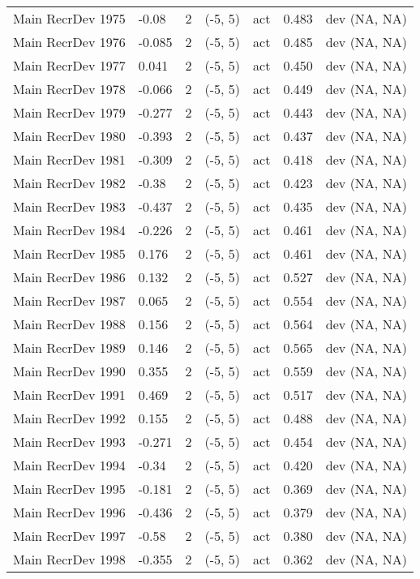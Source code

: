 \documentclass[11pt,
  english,
  letterpaper,
]{article}
\begin{document}
\begin{landscape}
\begin{longtable}[t]{>{\raggedright\arraybackslash}p{7.5cm}lllll>{\raggedright\arraybackslash}p{3.5cm}}
Main RecrDev 1975 & -0.08 & 2 & (-5, 5) & act & 0.483 & dev (NA, NA)\\
Main RecrDev 1976 & -0.085 & 2 & (-5, 5) & act & 0.485 & dev (NA, NA)\\
Main RecrDev 1977 & 0.041 & 2 & (-5, 5) & act & 0.450 & dev (NA, NA)\\
Main RecrDev 1978 & -0.066 & 2 & (-5, 5) & act & 0.449 & dev (NA, NA)\\
Main RecrDev 1979 & -0.277 & 2 & (-5, 5) & act & 0.443 & dev (NA, NA)\\
Main RecrDev 1980 & -0.393 & 2 & (-5, 5) & act & 0.437 & dev (NA, NA)\\
Main RecrDev 1981 & -0.309 & 2 & (-5, 5) & act & 0.418 & dev (NA, NA)\\
Main RecrDev 1982 & -0.38 & 2 & (-5, 5) & act & 0.423 & dev (NA, NA)\\
Main RecrDev 1983 & -0.437 & 2 & (-5, 5) & act & 0.435 & dev (NA, NA)\\
Main RecrDev 1984 & -0.226 & 2 & (-5, 5) & act & 0.461 & dev (NA, NA)\\
Main RecrDev 1985 & 0.176 & 2 & (-5, 5) & act & 0.461 & dev (NA, NA)\\
Main RecrDev 1986 & 0.132 & 2 & (-5, 5) & act & 0.527 & dev (NA, NA)\\
Main RecrDev 1987 & 0.065 & 2 & (-5, 5) & act & 0.554 & dev (NA, NA)\\
Main RecrDev 1988 & 0.156 & 2 & (-5, 5) & act & 0.564 & dev (NA, NA)\\
Main RecrDev 1989 & 0.146 & 2 & (-5, 5) & act & 0.565 & dev (NA, NA)\\
Main RecrDev 1990 & 0.355 & 2 & (-5, 5) & act & 0.559 & dev (NA, NA)\\
Main RecrDev 1991 & 0.469 & 2 & (-5, 5) & act & 0.517 & dev (NA, NA)\\
Main RecrDev 1992 & 0.155 & 2 & (-5, 5) & act & 0.488 & dev (NA, NA)\\
Main RecrDev 1993 & -0.271 & 2 & (-5, 5) & act & 0.454 & dev (NA, NA)\\
Main RecrDev 1994 & -0.34 & 2 & (-5, 5) & act & 0.420 & dev (NA, NA)\\
Main RecrDev 1995 & -0.181 & 2 & (-5, 5) & act & 0.369 & dev (NA, NA)\\
Main RecrDev 1996 & -0.436 & 2 & (-5, 5) & act & 0.379 & dev (NA, NA)\\
Main RecrDev 1997 & -0.58 & 2 & (-5, 5) & act & 0.380 & dev (NA, NA)\\
Main RecrDev 1998 & -0.355 & 2 & (-5, 5) & act & 0.362 & dev (NA, NA)\\

\end{longtable}
\end{landscape}
\end{document}
